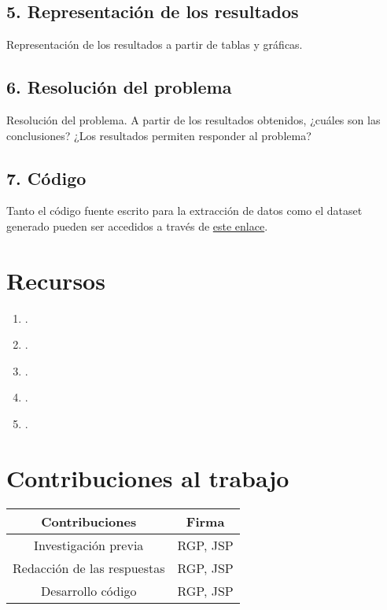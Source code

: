 \documentclass[12pt]{article}
\providecommand{\tightlist}{%
  \setlength{\itemsep}{0pt}\setlength{\parskip}{0pt}}
\begin{document}
\hypertarget{representacion}{%
\subsection{5. Representación de los resultados}\label{representacion}}
Representación de los resultados a partir de tablas y gráficas. 
\hypertarget{resolucion}{%
\subsection{6. Resolución del problema}\label{resolucion}}
Resolución del problema. A partir de los resultados obtenidos, ¿cuáles son las conclusiones? ¿Los resultados permiten responder al problema? 
\hypertarget{codigo}{%
\subsection{7. Código}\label{codigo}}

Tanto el código fuente escrito para la extracción de datos como el
dataset generado pueden ser accedidos a través de
\href{https://github.com/raquel8893/Tipologia-PRA2}{este enlace}.

\hypertarget{recursos}{%
\section{Recursos}\label{recursos}}

\begin{enumerate}
\def\labelenumi{\arabic{enumi}.}
\tightlist
\item
.\\
\item
.\\
\item
.\\
\item
.\\
\item
.\\

\end{enumerate}

\hypertarget{contribuciones}{%
\section{Contribuciones al trabajo}\label{contribuciones}}
\begin{tabular}{| c | c |}
\hline
Contribuciones & Firma \\ \hline
Investigación previa & RGP, JSP \\
Redacción de las respuestas & RGP, JSP \\
Desarrollo código & RGP, JSP \\ \hline
\end{tabular}
\end{document}
